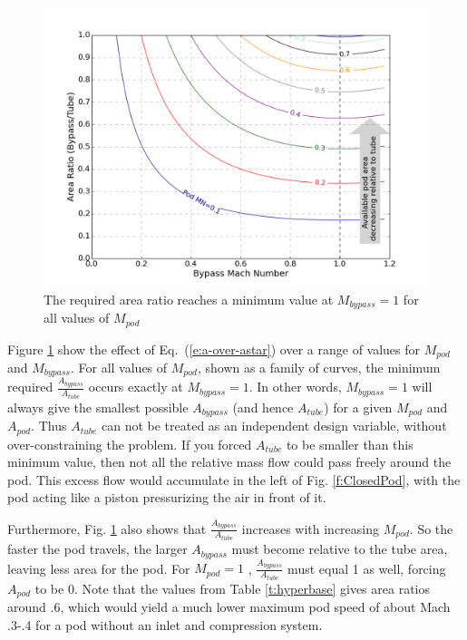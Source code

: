 \documentclass[heading.tex]{subfiles}
\begin{document}
\begin{figure}[!htb]
  \centering
  \includegraphics[width=.9\textwidth]{images/areaPlot.png}
  \caption{The required area ratio reaches a minimum value at $M_{bypass}=1$ for all values of $M_{pod}$}
  \label{f:choked-flow}
\end{figure}

Figure \ref{f:choked-flow} show the effect of Eq.~(\ref{e:a-over-astar}) over a range of values for $M_{pod}$ and $M_{bypass}$. 
For all values of $M_{pod}$, shown as a family of curves, the minimum required $\frac{A_{bypass}}{A_{tube}}$ occurs exactly at $M_{bypass}=1$.
In other words, 
$M_{bypass}=1$ will always give the smallest possible $A_{bypass}$ (and hence $A_{tube}$) for a given 
$M_{pod}$ and $A_{pod}$. Thus $A_{tube}$ can not be treated as an independent design variable, without over-constraining the problem.
If you forced $A_{tube}$ to be smaller than this minimum value, then not all the relative mass flow could pass freely around the pod. This excess 
flow would accumulate in the left of Fig. \ref{f:ClosedPod}, with the pod acting like a piston pressurizing the 
air in front of it. 

Furthermore, Fig. \ref{f:choked-flow} also shows that $\frac{A_{bypass}}{A_{tube}}$ 
increases with increasing $M_{pod}$. So the faster the pod travels, the larger $A_{bypass}$ 
must become relative to the tube area, leaving less area for the pod. For $M_{pod} = 1$ , $\frac{A_{bypass}}{A_{tube}}$ must 
equal 1 as well, forcing $A_{pod}$ to be 0. Note that the values from Table \ref{t:hyperbase} gives area ratios around .6, 
which would yield a much lower maximum pod speed of about Mach .3-.4 for a pod without an inlet and compression system. 
\end{document}
